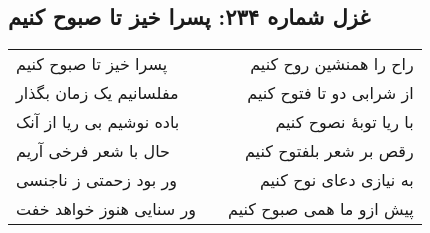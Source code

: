 \begin{center}
\section*{غزل شماره ۲۳۴: پسرا خیز تا صبوح کنیم}
\label{sec:234}
\begin{longtable}{l p{0.5cm} r}
پسرا خیز تا صبوح کنیم
&&
راح را همنشین روح کنیم
\\
مفلسانیم یک زمان بگذار
&&
از شرابی دو تا فتوح کنیم
\\
باده نوشیم بی ریا از آنک
&&
با ریا توبهٔ نصوح کنیم
\\
حال با شعر فرخی آریم
&&
رقص بر شعر بلفتوح کنیم
\\
ور بود زحمتی ز ناجنسی
&&
به نیازی دعای نوح کنیم
\\
ور سنایی هنوز خواهد خفت
&&
پیش ازو ما همی صبوح کنیم
\\
\end{longtable}
\end{center}
